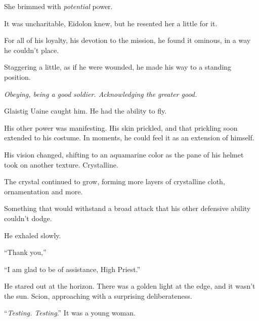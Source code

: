 She brimmed with \emph{potential} power.



It was uncharitable, Eidolon knew, but he resented her a little for it.



For all of his loyalty, his devotion to the mission, he found it ominous, in a way he couldn't place.



Staggering a little, as if he were wounded, he made his way to a standing position.



\emph{Obeying, being a good soldier.  Acknowledging the greater good.}



\blacksquare






Glaistig Uaine caught him.  He had the ability to fly.



His other power was manifesting.  His skin prickled, and that prickling soon extended to his costume.  In moments, he could feel it as an extension of himself.



His vision changed, shifting to an aquamarine color as the pane of his helmet took on another texture.  Crystalline.



The crystal continued to grow, forming more layers of crystalline cloth, ornamentation and more.



Something that would withstand a broad attack that his other defensive ability couldn't dodge.



He exhaled slowly.



``Thank you,''



``I am glad to be of assistance, High Priest.''



He stared out at the horizon.  There was a golden light at the edge, and it wasn't the sun.  Scion, approaching with a surprising deliberateness.



``\emph{Testing.  Testing}.''  It was a young woman.



